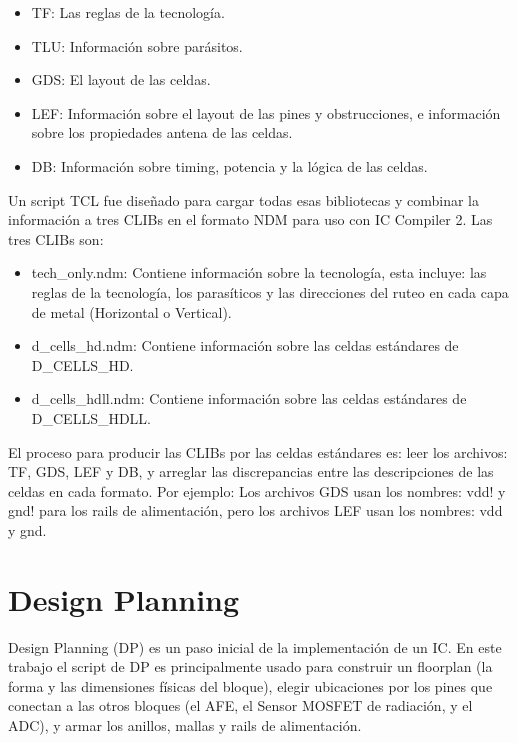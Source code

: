 \documentclass[a4paper, twoside, 11pt]{report}
\begin{document}
\begin{itemize}
  \item TF: Las reglas de la tecnología.
  \item TLU: Información sobre parásitos.
  \item GDS: El layout de las celdas.
  \item LEF: Información sobre el layout de las pines y obstrucciones, e información sobre los propiedades antena de las celdas.
  \item DB: Información sobre timing, potencia y la lógica de las celdas.
\end{itemize}

Un script TCL fue diseñado para cargar todas esas bibliotecas y combinar la información a tres CLIBs en el formato NDM para uso con IC Compiler 2. Las tres CLIBs son:

\begin{itemize}
  \item tech\_only.ndm: Contiene información sobre la tecnología, esta incluye: las reglas de la tecnología, los parasíticos y las direcciones del ruteo en cada capa de metal (Horizontal o Vertical).
  \item d\_cells\_hd.ndm: Contiene información sobre las celdas estándares de D\_CELLS\_HD.
  \item d\_cells\_hdll.ndm: Contiene información sobre las celdas estándares de D\_CELLS\_\-HDLL.
\end{itemize}

El proceso para producir las CLIBs por las celdas estándares es: leer los archivos: TF, GDS, LEF y DB, y arreglar las discrepancias entre las descripciones de las celdas en cada formato. Por ejemplo: Los archivos GDS usan los nombres: vdd! y gnd! para los rails de alimentación, pero los archivos LEF usan los nombres: vdd y gnd.

\FloatBarrier
\section{Design Planning}

Design Planning (DP) es un paso inicial de la implementación de un IC. En este trabajo el script de DP es principalmente usado para construir un floorplan (la forma y las dimensiones físicas del bloque), elegir ubicaciones por los pines que conectan a las otros bloques (el AFE, el Sensor MOSFET de radiación, y el ADC), y armar los anillos, mallas y rails de alimentación.
\end{document}
